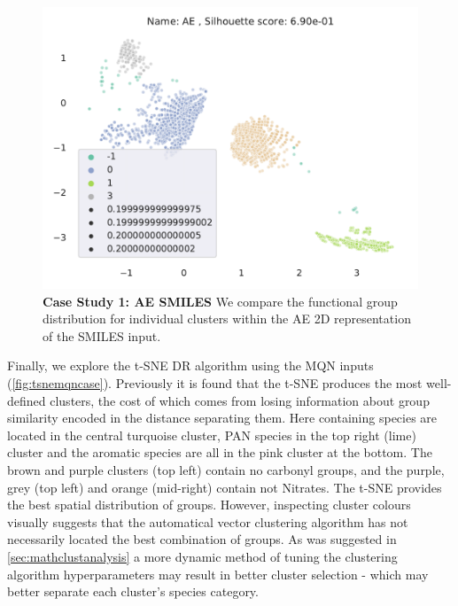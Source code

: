 \begin{figure}[H]
    \centering
    \includegraphics[height=\textwidth]{outputs/AE/smiles_all.pdf}
    \caption{\textbf{Case Study 1: AE SMILES} We compare the functional group distribution for individual clusters within the AE 2D representation of the SMILES input.}
    \label{fig:aesmilescase}
\end{figure}
\newpage

Finally, we explore the t-SNE DR algorithm using the MQN inputs (\autoref{fig:tsnemqncase}). Previously it is found that the t-SNE produces the most well-defined clusters, the cost of which comes from losing information about group similarity encoded in the distance separating them. Here  containing species are located in the central turquoise cluster, PAN species in the top right (lime) cluster and the aromatic species are all in the pink cluster at the bottom.
The brown and purple clusters (top left) contain no carbonyl groups, and the purple, grey (top left) and orange (mid-right) contain not Nitrates. The t-SNE provides the best spatial distribution of groups. However, inspecting cluster colours visually suggests that the automatical vector clustering algorithm has not necessarily located the best combination of groups. As was suggested in \autoref{sec:mathclustanalysis} a more dynamic method of tuning the clustering algorithm hyperparameters may result in better cluster selection - which may better separate each cluster's species category.

